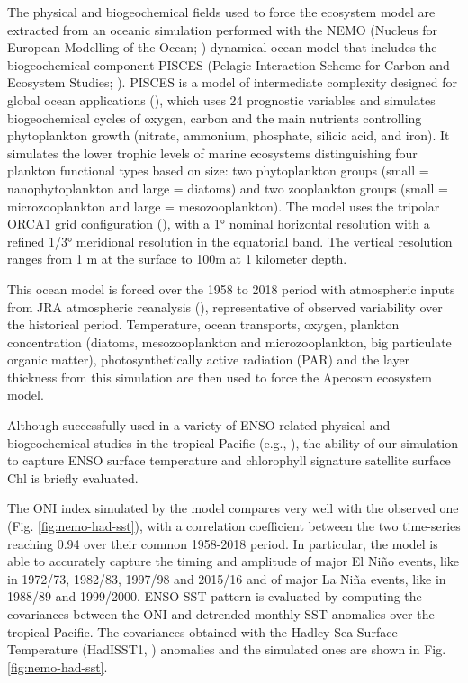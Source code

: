 The physical and biogeochemical fields used to force the ecosystem model are extracted from an oceanic simulation performed with the NEMO (Nucleus for European Modelling of the Ocean; \cite{madecNEMOOceanEngine2019}) dynamical ocean model that includes the biogeochemical component PISCES (Pelagic Interaction Scheme for Carbon and Ecosystem Studies; \citealt{aumontPISCESv2OceanBiogeochemical2015}). PISCES is a model of intermediate complexity designed for global ocean applications (\cite{aumontPISCESv2OceanBiogeochemical2015}), which uses 24 prognostic variables and simulates biogeochemical cycles of oxygen, carbon and the main nutrients controlling phytoplankton growth (nitrate, ammonium, phosphate, silicic acid, and iron). It simulates the lower trophic levels of marine ecosystems distinguishing four plankton functional types based on size: two phytoplankton groups (small = nanophytoplankton and large = diatoms) and two zooplankton groups (small = microzooplankton and large = mesozooplankton). The model uses the tripolar ORCA1 grid configuration (\cite{madecGlobalOceanMesh1996}), with a 1° nominal horizontal resolution with a refined 1/3° meridional resolution in the equatorial band. The vertical resolution ranges from 1 m at the surface to 100m at 1 kilometer depth.

This ocean model is forced over the 1958 to 2018 period with atmospheric inputs from JRA atmospheric reanalysis (\cite{kobayashiJRA55ReanalysisGeneral2015}), representative of observed variability over the historical period. Temperature, ocean transports, oxygen, plankton concentration (diatoms, mesozooplankton and microzooplankton, big particulate organic matter), photosynthetically active radiation (PAR) and the layer thickness from this simulation are then used to force the Apecosm ecosystem model.

Although successfully used in a variety of ENSO-related physical and biogeochemical studies in the tropical Pacific (e.g., \cite{vialardModelStudyOceanic2001, lengaigneOceanResponseMarch2002, lengaigneInfluenceOceanicBiology2007, schneiderClimateinducedInterannualVariability2008, masottiLargescaleShiftsPhytoplankton2011, currieIndianOceanDipole2013}), the ability of our simulation to capture ENSO surface temperature and chlorophyll signature satellite surface Chl is briefly evaluated. 

The ONI index simulated by the model compares very well with the observed one (Fig. \ref{fig:nemo-had-sst}), with a correlation coefficient between the two time-series reaching 0.94 over their common 1958-2018 period. In particular, the model is able to accurately capture the timing and amplitude of major El Niño events, like in 1972/73, 1982/83, 1997/98 and 2015/16 and of major La Niña events, like in 1988/89 and 1999/2000. ENSO SST pattern is evaluated  by computing the covariances between the ONI and detrended monthly SST anomalies over the tropical Pacific. The covariances obtained with the Hadley Sea-Surface Temperature (HadISST1, \cite{raynerGlobalAnalysesSea2003}) anomalies and the simulated ones are shown in Fig.\ref{fig:nemo-had-sst}.

